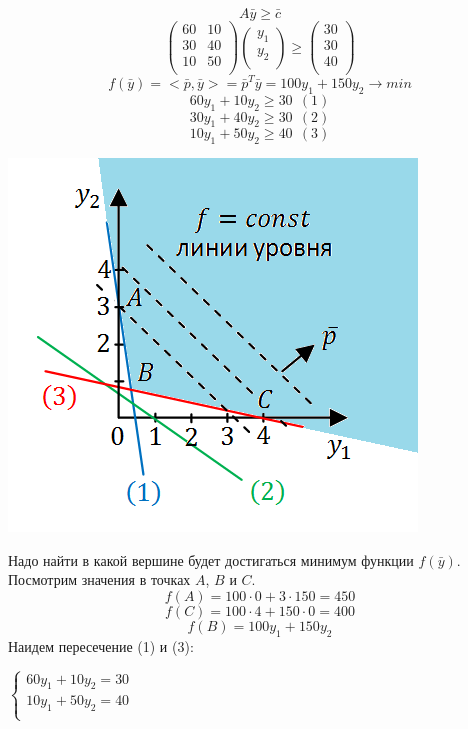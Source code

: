 \documentclass[12pt]{article}
\theoremstyle{definition}
\numberwithin{equation}{section}
\begin{document}
	$$A\bar y \geqslant \bar c$$
	\[\begin{pmatrix}
	60 & 10\\
	30 & 40\\
	10 & 50\\
	\end{pmatrix}\begin{pmatrix}
	y_1\\
	y_2\\
	\end{pmatrix} \geqslant \begin{pmatrix}
	30\\
	30\\
	40\\
	\end{pmatrix}\]
	$$f(\bar y)=<\bar p, \bar y>=\bar p^T\bar y=100y_1+150y_2 \to min$$
	$$60y_1+10y_2 \geqslant 30~~(1)$$
	$$30y_1+40y_2 \geqslant 30~~(2)$$
	$$10y_1+50y_2 \geqslant 40~~(3)$$
	\begin{center}
		\includegraphics[scale=0.8]{l18_2.png}\\
	\end{center}
	Надо найти в какой вершине будет достигаться минимум функции $f(\bar y)$. Посмотрим значения в точках $A$, $B$ и $C$.\\
	$$f(A)=100\cdot 0+3\cdot 150=450$$
	$$f(C)=100\cdot 4+150 \cdot 0=400$$
	$$f(B)=100y_1+150y_2$$
	Наидем пересечение (1) и (3):
	\begin{center}
		$
		\left\{
		\begin{array}{lcl}
		60y_1+10y_2=30\\
		10y_1+50y_2=40\\
		\end{array}
		\right.
		$
	\end{center}
\end{document}

